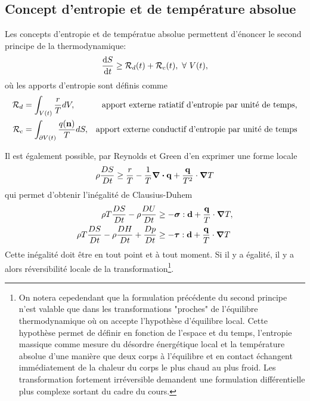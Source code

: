 \documentclass[a4paper,11pt]{report}
\newcommand{\bs}[1]{\boldsymbol{#1}}
\newcommand{\dvm}[2]{\frac{D #1}{D #2}}
\newcommand{\recip}[1]{\frac{1}{#1}}
\begin{document}
      \subsection{Concept d'entropie et de température absolue}
        Les concepts d'entropie et de températue absolue permettent d'énoncer le second principe de la thermodynamique:
        \begin{equation}
          \dv{S}{t} \geq \mathcal{R}_d(t) + \mathcal{R}_c(t),~\forall~V(t),
        \end{equation}
       où les apports d'entropie sont définis comme
       \begin{align*}
         \mathcal{R}_d &= \int_{V(t)} \frac{r}{T} dV, & \textrm{apport externe ratiatif d'entropie par unité de temps,}\\
         \mathcal{R}_c &= \int_{\partial V(t)} \frac{q(\vb{n})}{T}dS, & \textrm{apport externe conductif d'entropie par unité de temps}
       \end{align*}

       Il est également possible, par Reynolds et Green d'en exprimer une forme locale
       \begin{equation}
         \rho \dvm{S}{t} \geq \frac{r}{T} - \recip{T}\div \vb{q} + \frac{\vb{q}}{T^2} \cdot \grad T
       \end{equation}
       qui permet d'obtenir l'inégalité de Clausius-Duhem
       \begin{equation}
         \begin{aligned}
           \rho T \dvm{S}{t} - \rho \dvm{U}{t} &\geq - \bs{\sigma} : \vb{d} + \frac{\vb{q}}{T} \cdot \grad T,\\
           \rho T \dvm{S}{t} - \rho \dvm{H}{t} + \dvm{p}{t} &\geq - \bs{\tau} : \vb{d} + \frac{\vb{q}}{T} \cdot \grad T
         \end{aligned}
       \end{equation}
       Cette inégalité doit être en tout point et à tout moment. Si il y a égalité, il y a alors réversibilité locale de la transformation\footnote{On notera cepedendant que la formulation précédente du second principe n'est valable que dans les transformations "proches" de l'équilibre thermodynamique où on accepte l'hypothèse d'équilibre local. Cette hypothèse permet de définir en fonction de l'espace et du temps, l'entropie massique comme mesure du désordre énergétique local et la température absolue d'une manière que deux corps à l'équilibre et en contact échangent immédiatement de la chaleur du corps le plus chaud au plus froid. Les transformation fortement irréversible demandent une formulation différentielle plus complexe sortant du cadre du cours.}.
\end{document}
